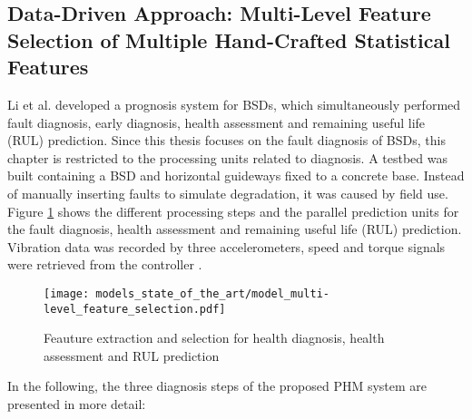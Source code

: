 \subsection{Data-Driven Approach: Multi-Level Feature Selection of Multiple Hand-Crafted Statistical Features}
Li et al. \cite{LiPin2018} developed a prognosis system for BSDs, which simultaneously performed fault diagnosis, early diagnosis, health assessment and remaining useful life (RUL) prediction. Since this thesis focuses on the fault diagnosis of BSDs, this chapter is restricted to the processing units related to diagnosis. A testbed was built containing a BSD and horizontal guideways fixed to a concrete base. Instead of manually inserting faults to simulate degradation, it was caused by field use. Figure \ref{fig:level_feature_selection_model} shows the different processing steps and the parallel prediction units for the fault diagnosis, health assessment and remaining useful life (RUL) prediction. Vibration data was recorded by three accelerometers, speed and torque signals were retrieved from the controller \cite{LiPin2018}. 

\begin{figure}[H]
  \centering
  \texttt{[image: models\_state\_of\_the\_art/model\_multi-level\_feature\_selection.pdf]}
  \caption{Feauture extraction and selection for health diagnosis, health assessment and RUL prediction \cite{LiPin2018}}
  \label{fig:level_feature_selection_model}
\end{figure}

In the following, the three diagnosis steps of the proposed PHM system are presented in more detail:

